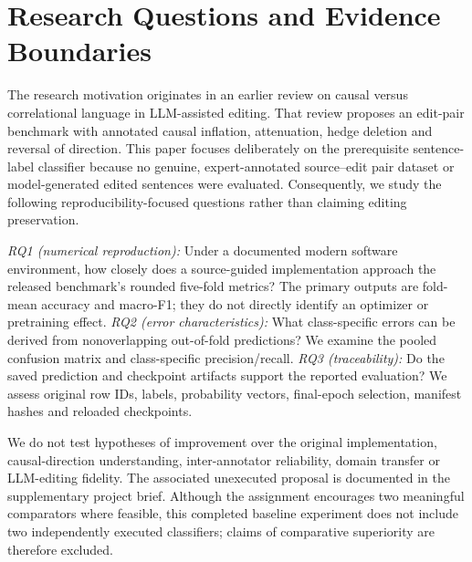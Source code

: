 \documentclass[conference]{IEEEtran}
\begin{document}
\section{Research Questions and Evidence Boundaries}\label{sec:rq}
The research motivation originates in an earlier review on causal versus correlational language in LLM-assisted editing. That review proposes an edit-pair benchmark with annotated causal inflation, attenuation, hedge deletion and reversal of direction. This paper focuses deliberately on the prerequisite sentence-label classifier because no genuine, expert-annotated source--edit pair dataset or model-generated edited sentences were evaluated. Consequently, we study the following reproducibility-focused questions rather than claiming editing preservation.

\emph{RQ1 (numerical reproduction):} Under a documented modern software environment, how closely does a source-guided implementation approach the released benchmark's rounded five-fold metrics? The primary outputs are fold-mean accuracy and macro-F1; they do not directly identify an optimizer or pretraining effect. \emph{RQ2 (error characteristics):} What class-specific errors can be derived from nonoverlapping out-of-fold predictions? We examine the pooled confusion matrix and class-specific precision/recall. \emph{RQ3 (traceability):} Do the saved prediction and checkpoint artifacts support the reported evaluation? We assess original row IDs, labels, probability vectors, final-epoch selection, manifest hashes and reloaded checkpoints.

We do not test hypotheses of improvement over the original implementation, causal-direction understanding, inter-annotator reliability, domain transfer or LLM-editing fidelity. The associated unexecuted proposal is documented in the supplementary project brief. Although the assignment encourages two meaningful comparators where feasible, this completed baseline experiment does not include two independently executed classifiers; claims of comparative superiority are therefore excluded.
\end{document}
